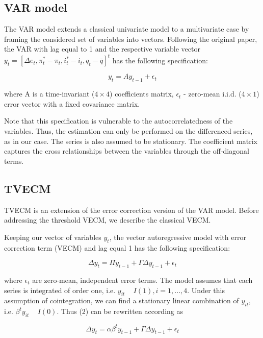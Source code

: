 \documentclass[a4paper,10pt]{article}
\begin{document}
\subsection{VAR model}\label{appx:var}

The VAR model extends a classical univariate model to a multivariate case by framing the considered set of variables into vectors. Following the original paper, the VAR with lag equal to 1 and the respective variable vector $y_t = [\Delta e_t, \pi^{*}_t - \pi_t, i^{*}_t - i_t, q_t - \bar{q}]^t$ has the following specification:

\begin{equation}
    y_t = Ay_{t-1} + \epsilon_t
\end{equation}

where A is a time-invariant ($4 \times 4$) coefficients matrix, $\epsilon_t$ - zero-mean i.i.d. ($4 \times 1$) error vector with a fixed covariance matrix. 

Note that this specification is vulnerable to the autocorrelatedness of the variables. Thus, the estimation can only be performed on the differenced series, as in our case. The series is also assumed to be stationary. The coefficient matrix captures the cross relationships between the variables through the off-diagonal terms.

\subsection{TVECM}\label{appx:tvecm}

TVECM is an extension of the error correction version of the VAR model. Before addressing the threshold VECM, we describe the classical VECM. 

Keeping our vector of variables $y_t$, the vector autoregressive model with error correction term (VECM) and lag equal 1 has the following specification:

\begin{equation}
\Delta y_t = \Pi y_{t-1} + \Gamma\Delta y_{t-1} + \epsilon_t 
\end{equation}

where $\epsilon_t$ are zero-mean, independent error terms. The model assumes that each series is integrated of order one, i.e. $y_{it}$ ~ $I(1), i = 1, ... , 4$. Under this assumption of cointegration, we can find a stationary linear combination of  $y_{it}$, i.e. $\beta^t y_{it}$ ~ $I(0)$. Thus (2) can be rewritten according as 

\begin{equation}
\Delta y_t = \alpha\beta^ty_{t-1} + \Gamma\Delta y_{t-1} + \epsilon_t 
\end{equation}
\end{document}

